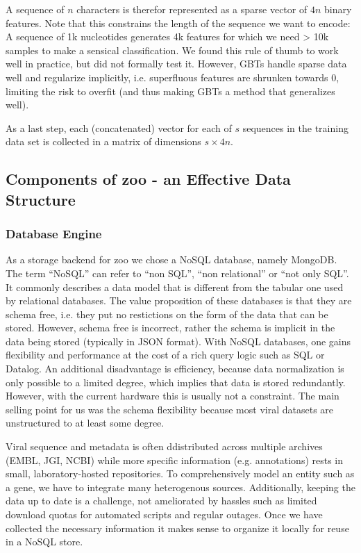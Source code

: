 A sequence of $n$ characters is therefor represented as a sparse vector of $4n$ binary features. Note that this constrains the length of the sequence we want to encode: A sequence of 1k nucleotides generates 4k features for which we need > 10k samples to make a sensical classification. We found this rule of thumb to work well in practice, but did not formally test it. However, GBTs handle sparse data well and regularize implicitly, i.e. superfluous features are shrunken towards 0, limiting the risk to overfit (and thus making GBTs a method that generalizes well).

As a last step, each (concatenated) vector for each of $s$ sequences in the training data set is collected in a matrix of dimensions $s \times 4n$.


\subsection{Components of zoo - an Effective Data Structure}

\subsubsection{Database Engine}\label{database-engine}

As a storage backend for zoo we chose a NoSQL database, namely MongoDB. The term ``NoSQL'' can refer to ``non SQL'', ``non relational'' or ``not only SQL''. It commonly describes a data model that is different from the tabular one used by relational databases. The value proposition of these databases is that they are schema free, i.e. they put no restictions on the form of the data that can be stored. However, schema free is incorrect, rather the schema is implicit in the data being stored (typically in JSON format). With NoSQL databases, one gains flexibility and performance at the cost of a rich query logic such as SQL or Datalog. An additional disadvantage is efficiency, because data normalization is only possible to a limited degree, which implies that data is stored redundantly. However, with the current hardware this is usually not a constraint. The main selling point for us was the schema flexibility because most viral datasets are unstructured to at least some degree.

Viral sequence and metadata is often ddistributed across multiple archives (EMBL, JGI, NCBI) while more specific information (e.g. annotations) rests in small, laboratory-hosted repositories. To comprehensively model an entity such as a gene, we have to integrate many heterogenous sources. Additionally, keeping the data up to date is a challenge, not ameliorated by hassles such as limited download quotas for automated scripts and regular outages. Once we have collected the necessary information it makes sense to organize it locally for reuse in a NoSQL store.


